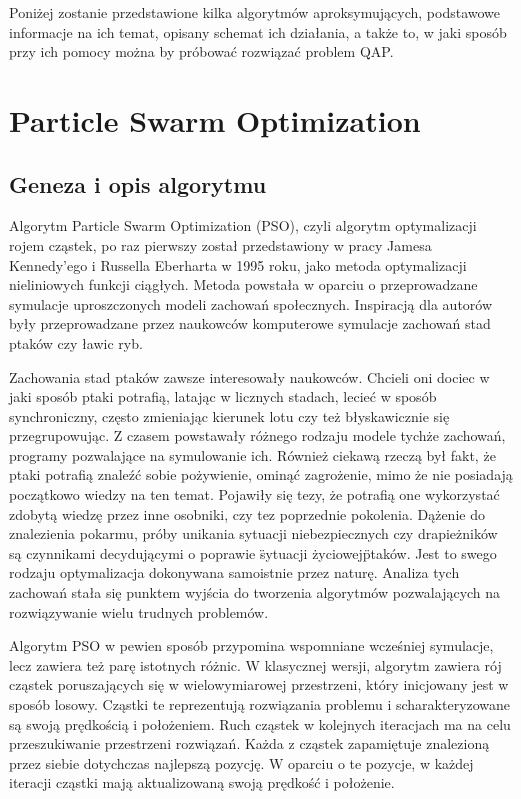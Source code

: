Poniżej zostanie przedstawione kilka algorytmów aproksymujących, podstawowe informacje na ich temat, opisany schemat ich działania, a także to, w jaki sposób przy ich pomocy można by próbować rozwiązać problem QAP.
\section{Particle Swarm Optimization}
\label{sec:PSO}
\subsection{Geneza i opis algorytmu} 
Algorytm Particle Swarm Optimization (PSO), czyli algorytm optymalizacji rojem cząstek, po raz pierwszy został przedstawiony w pracy Jamesa Kennedy'ego i Russella Eberharta w 1995 roku, jako metoda optymalizacji nieliniowych funkcji ciągłych. Metoda powstała w oparciu o przeprowadzane symulacje uproszczonych modeli zachowań społecznych. Inspiracją dla autorów były przeprowadzane przez naukowców komputerowe symulacje zachowań stad ptaków czy ławic ryb.

Zachowania stad ptaków zawsze interesowały naukowców. Chcieli oni dociec w jaki sposób ptaki potrafią, latając w licznych stadach, lecieć w sposób synchroniczny, często zmieniając kierunek lotu czy też błyskawicznie się przegrupowując. Z czasem powstawały różnego rodzaju modele tychże zachowań, programy pozwalające na symulowanie ich. Również ciekawą rzeczą był fakt, że ptaki potrafią znaleźć sobie pożywienie, ominąć zagrożenie, mimo że nie posiadają początkowo wiedzy na ten temat. Pojawiły się tezy, że potrafią one wykorzystać zdobytą wiedzę przez inne osobniki, czy tez poprzednie pokolenia. Dążenie do znalezienia pokarmu, próby unikania sytuacji niebezpiecznych czy drapieżników są czynnikami decydującymi o poprawie \"sytuacji życiowej\" ptaków. Jest to swego rodzaju optymalizacja dokonywana samoistnie przez naturę. Analiza tych zachowań stała się punktem wyjścia do tworzenia algorytmów pozwalających na rozwiązywanie wielu trudnych problemów.

Algorytm PSO w pewien sposób przypomina wspomniane wcześniej symulacje, lecz zawiera też parę istotnych różnic. W klasycznej wersji, algorytm zawiera rój cząstek poruszających się w wielowymiarowej przestrzeni, który inicjowany jest w sposób losowy. Cząstki te reprezentują rozwiązania problemu i scharakteryzowane są swoją prędkością i położeniem. Ruch cząstek w kolejnych iteracjach ma na celu przeszukiwanie przestrzeni rozwiązań. Każda z cząstek zapamiętuje znalezioną przez siebie dotychczas najlepszą pozycję. W oparciu o te pozycje, w każdej iteracji cząstki mają aktualizowaną swoją prędkość i położenie.


